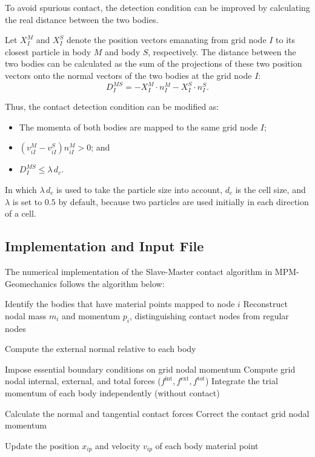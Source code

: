 To avoid spurious contact, the detection condition can be improved by calculating the real distance between the two bodies.

Let $X_I^M$ and $X_I^S$ denote the position vectors emanating from grid node $I$ to its closest particle in body $M$ and body $S$, respectively.  
The distance between the two bodies can be calculated as the sum of the projections of these two position vectors onto the normal vectors of the two bodies at the grid node $I$:
\begin{equation}
    D^{MS}_I = -X_I^M \cdot n_I^M - X_I^S \cdot n_I^S.
\end{equation}

Thus, the contact detection condition can be modified as:
\begin{itemize}
    \item The momenta of both bodies are mapped to the same grid node $I$;
    \item $\left( v^{M}_{iI} - v^{S}_{iI} \right)n^{M}_{iI} > 0$; and
    \item $D^{MS}_I \leq \lambda \, d_c$.
\end{itemize}

In which $\lambda \, d_c$ is used to take the particle size into account,  
$d_c$ is the cell size, and $\lambda$ is set to $0.5$ by default,  
because two particles are used initially in each direction of a cell.

\subsection{Implementation and Input File }

The numerical implementation of the Slave-Master contact algorithm in MPM-Geomechanics follows the algorithm below:


\begin{algorithm}[H]
	\caption{MPM Multi-body Contact Algorithm}
	\label{alg:mpm_contact}
	\begin{algorithmic}[1]
		
		\State Identify the bodies that have material points mapped to node $i$
		\State Reconstruct nodal mass $m_i$ and momentum $p_i$, distinguishing contact nodes from regular nodes
		
		\State Compute the external normal relative to each body
		\EndIf
		
		\State Impose essential boundary conditions on grid nodal momentum
		\State Compute grid nodal internal, external, and total forces ($f^{\text{int}}, f^{\text{ext}}, f^{\text{tot}}$)
		\State Integrate the trial momentum of each body independently (without contact)
		\EndFor
		
		\State Calculate the normal and tangential contact forces
		\State Correct the contact grid nodal momentum
		\EndIf
		\EndFor
		
		\State Update the position $x_{ip}$ and velocity $v_{ip}$ of each body material point
	\end{algorithmic}
\end{algorithm}


